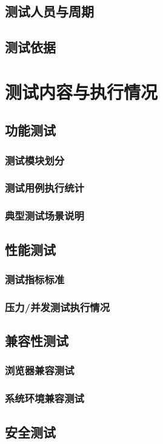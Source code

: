 \documentclass{../template/softeng}
\begin{document}
\subsection{测试人员与周期}
\subsection{测试依据}

\section{测试内容与执行情况}
\subsection{功能测试}
\subsubsection{测试模块划分}
\subsubsection{测试用例执行统计}
\subsubsection{典型测试场景说明}
\subsection{性能测试}
\subsubsection{测试指标标准}
\subsubsection{压力/并发测试执行情况}
\subsection{兼容性测试}
\subsubsection{浏览器兼容测试}
\subsubsection{系统环境兼容测试}
\subsection{安全测试}
\end{document}
